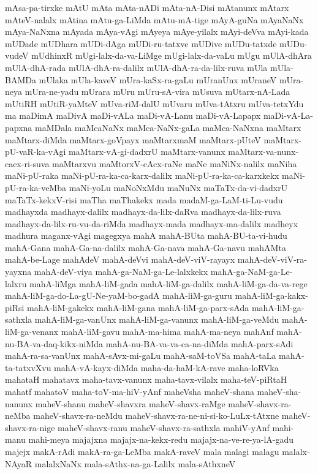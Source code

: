 {mAsa-pa-tirxke
mAtU
mAta
mAta-nADi
mAta-nA-Disi
mAtanunx
mAtarx
mAteV-nalalx
mAtina
mAtu-ga-LiMda
mAtu-mA-tige
mAyA-guNa
mAyaNaNx
mAya-NaNxna
mAyada
mAya-vAgi
mAyeya
mAye-yilalx
mAyi-deVva
mAyi-kada
mUDade
mUDhara
mUDi-dAga
mUDi-ru-tatxve
mUDive
mUDu-tatxde
mUDu-vudeV
mUdhinxR
mUgi-lalx-da-va-LiMge
mUgi-lalx-da-vaLu
mUgu
mUlA-dhAra
mUlA-dhA-rada
mUlA-dhA-ra-dalilx
mUlA-dhA-ra-da-lilx-ruva
mUla
mUla-BAMDa
mUlaka
mUla-kaveV
mUra-kaSx-ra-gaLu
mUranUnx
mUraneV
mUra-neya
mUra-ne-yadu
mUrara
mUru
mUru-sA-vira
mUsuva
mUtarx-nA-Lada
mUtiRH
mUtiR-yaMteV
mUva-riM-dalU
mUvaru
mUva-tAtxru
mUva-tetxYdu
ma
maDimA
maDivA
maDi-vALa
maDi-vA-Lanu
maDi-vA-Lapapx
maDi-vA-La-papxna
maMDala
maMcaNaNx
maMca-NaNx-gaLa
maMca-NaNxna
maMtarx
maMtarx-diMda
maMtarx-goVpayx
maMtarxmaM
maMtarx-pUteV
maMtarx-pU-vaR-ka-vAgi
maMtarx-vA-gi-dadxrU
maMtarx-vanunx
maMtarx-va-nunx-cacx-ri-suva
maMtarxvu
maMtorxV-cAcx-raNe
maNe
maNiNx-nalilx
maNiha
maNi-pU-raka
maNi-pU-ra-ka-ca-karx-dalilx
maNi-pU-ra-ka-ca-karxkekx
maNi-pU-ra-ka-veMba
maNi-yoLu
maNoNxMdu
maNuNx
maTaTx-da-vi-dadxrU
maTaTx-kekxV-risi
maTha
maThakekx
mada
madaM-ga-LaM-ti-Lu-vudu
madhayxda
madhayx-dalilx
madhayx-da-lilx-daRva
madhayx-da-lilx-ruva
madhayx-da-lilx-ru-vu-da-riMda
madhayx-mada
madhayx-ma-dalilx
madheyx
madhura
maganx-vAgi
magegxya
mahA
mahA-BUta
mahA-BU-ta-vi-hudu
mahA-Gana
mahA-Ga-na-dalilx
mahA-Ga-nava
mahA-Ga-navu
mahAMta
mahA-be-Lage
mahAdeV
mahA-deVvi
mahA-deV-viV-rayayx
mahA-deV-viV-ra-yayxna
mahA-deV-viya
mahA-ga-NaM-ga-Le-lalxkekx
mahA-ga-NaM-ga-Le-lalxru
mahA-liMga
mahA-liM-gada
mahA-liM-ga-dalilx
mahA-liM-ga-da-va-rege
mahA-liM-ga-do-La-gU-Ne-yaM-bo-gadA
mahA-liM-ga-guru
mahA-liM-ga-kakx-piRsi
mahA-liM-gakekx
mahA-liM-gana
mahA-liM-ga-parx-sAda
mahA-liM-ga-sathxla
mahA-liM-ga-vanUnx
mahA-liM-ga-vanunx
mahA-liM-ga-veMdu
mahA-liM-ga-venanx
mahA-liM-gavu
mahA-ma-hima
mahA-ma-neya
mahAnf
mahA-nu-BA-va-daq-kikx-niMda
mahA-nu-BA-va-va-ca-na-diMda
mahA-parx-sAdi
mahA-ra-sa-vanUnx
mahA-sAvx-mi-gaLu
mahA-saM-toVSa
mahA-taLa
mahA-ta-tatxvXvu
mahA-vA-kayx-diMda
maha-da-haM-kA-rave
maha-loRVka
mahataH
mahatavx
maha-tavx-vanunx
maha-tavx-vilalx
maha-teV-piRtaH
mahatf
mahatoV
maha-toV-ma-hiV-yAnf
maheVsha
maheV-shana
maheV-sha-nanunx
maheV-shanu
maheV-shavxra
maheV-shavx-raMge
maheV-shavx-ra-neMba
maheV-shavx-ra-neMdu
maheV-shavx-ra-ne-ni-si-ko-LuLx-tAtxne
maheV-shavx-ra-nige
maheV-shavx-ranu
maheV-shavx-ra-sathxla
mahiV-yAnf
mahi-manu
mahi-meya
majajxna
majajx-na-kekx-redu
majajx-na-ve-re-ya-lA-gadu
majejx
makA-rAdi
makA-ra-ga-LeMba
makA-raveV
mala
malagi
malagu
malalx-NAyaR
malalxNaNx
mala-sAthx-na-ga-Lalilx
mala-sAthxneV
}
